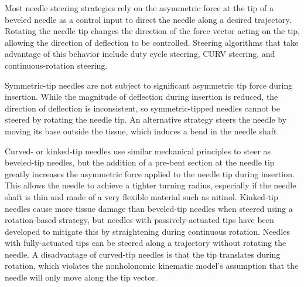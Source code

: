 Most needle steering strategies rely on the asymmetric force at the tip of a beveled needle as a control input to direct the needle along a desired trajectory. Rotating the needle tip changes the direction of the force vector acting on the tip, allowing the direction of deflection to be controlled. Steering algorithms that take advantage of this behavior include duty cycle steering\cite{duindam_three-dimensional_2010}, CURV steering, and continuous-rotation steering.

Symmetric-tip needles are not subject to significant asymmetric tip force during insertion\cite{dimaio_needle_2003}. While the magnitude of deflection during insertion is reduced, the direction of deflection is inconsistent, so symmetric-tipped needles cannot be steered by rotating the needle tip. An alternative strategy steers the needle by moving its base outside the tissue, which induces a bend in the needle shaft\cite{glozman_image-guided_2007}.

Curved- or kinked-tip needles use similar mechanical principles to steer as beveled-tip needles, but the addition of a pre-bent section at the needle tip greatly increases the asymmetric force applied to the needle tip during insertion\cite{reed_integrated_2008}. This allows the needle to achieve a tighter turning radius, especially if the needle shaft is thin and made of a very flexible material such as nitinol. Kinked-tip needles cause more tissue damage than beveled-tip needles when steered using a rotation-based strategy, but needles with passively-actuated tips have been developed to mitigate this by straightening during continuous rotation\cite{swaney_flexure-based_2013}. Needles with fully-actuated tips can be steered along a trajectory without rotating the needle\cite{roesthuis_modeling_2015}. A disadvantage of curved-tip needles is that the tip translates during rotation, which violates the nonholonomic kinematic model's assumption that the needle will only move along the tip vector\cite{reed_integrated_2008}.



